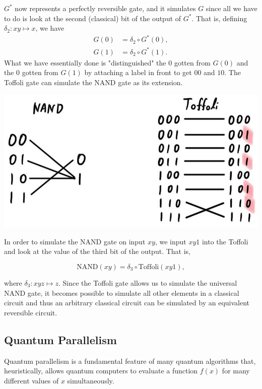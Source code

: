 \documentclass{article}
\theoremstyle{definition}
\begin{document}
    $G^*$ now represents a perfectly reversible gate, and it simulates $G$ since all we have to do is look at the second (classical) bit of the output of $G^*$. That is, defining $\delta_2: xy \mapsto x$, we have
    \begin{align*}
      G(0) & = \delta_2 \circ G^* (0), \\
      G(1) & = \delta_2 \circ G^* (1).
    \end{align*}
    What we have essentially done is "distinguished" the $0$ gotten from $G(0)$ and the $0$ gotten from $G(1)$ by attaching a label in front to get $00$ and $10$. The Toffoli gate can simulate the NAND gate as its extension.

    \begin{center}
      \includegraphics[scale=0.3]{img/Toffoli_NAND_extension.jpg}
    \end{center}

    In order to simulate the NAND gate on input $xy$, we input $xy1$ into the Toffoli and look at the value of the third bit of the output. That is,

      \[\text{NAND}(xy) = \delta_3 \circ \text{Toffoli}(xy1),\]

    where $\delta_3: xyz \mapsto z$. Since the Toffoli gate allows us to simulate the universal NAND gate, it becomes possible to simulate all other elements in a classical circuit and thus an arbitrary classical circuit can be simulated by an equivalent reversible circuit.

  \subsection{Quantum Parallelism}

    Quantum parallelism is a fundamental feature of many quantum algorithms that, heuristically, allows quantum computers to evaluate a function $f(x)$ for many different values of $x$ simultaneously.
\end{document}
